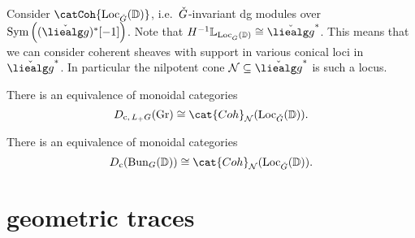 \documentclass[english, no-theorem-numbers]{short-notes}
\begin{document}
Consider $\catCoh{\Loc_{\ld G}(\mathbb D)}$, i.e.~$\check{G}$-invariant dg modules over $\operatorname{Sym}\left( (\ld{\liealg g})^*[-1] \right)$.
Note that $H^{-1}\mathbb L_{\Loc_{\ld G}(\mathbb D)} \cong \ld{\liealg g}^*$.
This means that we can consider coherent sheaves with support in various conical loci in $\ld{\liealg g}^*$.
In particular the nilpotent cone $\mathcal N \subseteq \ld{\liealg g}^*$ is such a locus.
\begin{Thm}
    There is an equivalence of monoidal categories
    \[
        D_{\mathrm c,\, L_+G}(\Gr) \cong
        \cat{Coh}_{\mathcal N}(\Loc_{\ld G}(\mathbb D)).
    \]
\end{Thm}
\begin{Cor}
    There is an equivalence of monoidal categories
    \[
        D_{\mathrm c}(\Bun_G(\mathbb D)) \cong
        \cat{Coh}_{\mathcal N}(\Loc_{\ld G}(\mathbb D)).
    \] 
\end{Cor}
\section{geometric traces}

\printbibliography
\end{document}
